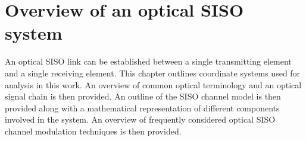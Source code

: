 \chapter{Overview of an optical SISO system}
\label{chapter:siso}
\thispagestyle{myheadings}
An optical SISO link can be established between a single transmitting element and a single receiving element. This chapter outlines coordinate systems used for analysis in this work. An overview of common optical terminology and an optical signal chain is then provided. An outline of the SISO channel model is then provided along with a mathematical representation of different components involved in the system. An overview of frequently considered optical SISO channel modulation techniques is then provided. 







